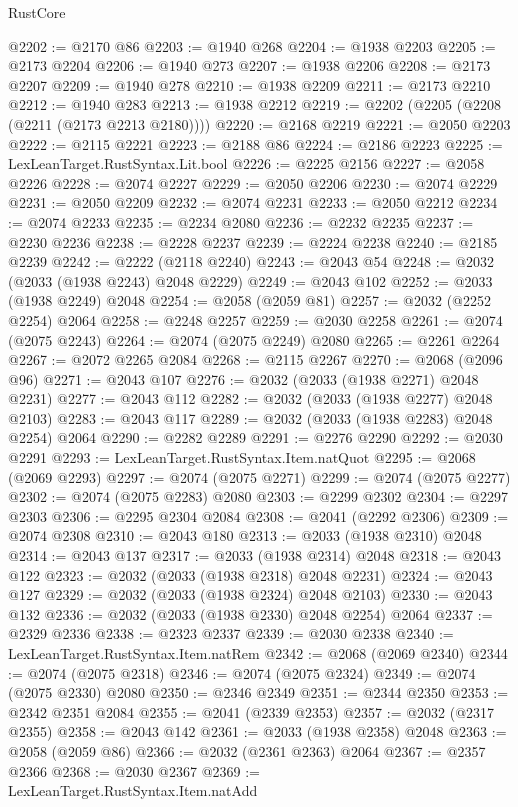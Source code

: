 \begin{lexlean}{RustCore}
\begin{coremodule}
@2202 := @2170 @86
@2203 := @1940 @268
@2204 := @1938 @2203
@2205 := @2173 @2204
@2206 := @1940 @273
@2207 := @1938 @2206
@2208 := @2173 @2207
@2209 := @1940 @278
@2210 := @1938 @2209
@2211 := @2173 @2210
@2212 := @1940 @283
@2213 := @1938 @2212
@2219 := @2202 (@2205 (@2208 (@2211 (@2173 @2213 @2180))))
@2220 := @2168 @2219
@2221 := @2050 @2203
@2222 := @2115 @2221
@2223 := @2188 @86
@2224 := @2186 @2223
@2225 := LexLeanTarget.RustSyntax.Lit.bool
@2226 := @2225 @2156
@2227 := @2058 @2226
@2228 := @2074 @2227
@2229 := @2050 @2206
@2230 := @2074 @2229
@2231 := @2050 @2209
@2232 := @2074 @2231
@2233 := @2050 @2212
@2234 := @2074 @2233
@2235 := @2234 @2080
@2236 := @2232 @2235
@2237 := @2230 @2236
@2238 := @2228 @2237
@2239 := @2224 @2238
@2240 := @2185 @2239
@2242 := @2222 (@2118 @2240)
@2243 := @2043 @54
@2248 := @2032 (@2033 (@1938 @2243) @2048 @2229)
@2249 := @2043 @102
@2252 := @2033 (@1938 @2249) @2048
@2254 := @2058 (@2059 @81)
@2257 := @2032 (@2252 @2254) @2064
@2258 := @2248 @2257
@2259 := @2030 @2258
@2261 := @2074 (@2075 @2243)
@2264 := @2074 (@2075 @2249) @2080
@2265 := @2261 @2264
@2267 := @2072 @2265 @2084
@2268 := @2115 @2267
@2270 := @2068 (@2096 @96)
@2271 := @2043 @107
@2276 := @2032 (@2033 (@1938 @2271) @2048 @2231)
@2277 := @2043 @112
@2282 := @2032 (@2033 (@1938 @2277) @2048 @2103)
@2283 := @2043 @117
@2289 := @2032 (@2033 (@1938 @2283) @2048 @2254) @2064
@2290 := @2282 @2289
@2291 := @2276 @2290
@2292 := @2030 @2291
@2293 := LexLeanTarget.RustSyntax.Item.natQuot
@2295 := @2068 (@2069 @2293)
@2297 := @2074 (@2075 @2271)
@2299 := @2074 (@2075 @2277)
@2302 := @2074 (@2075 @2283) @2080
@2303 := @2299 @2302
@2304 := @2297 @2303
@2306 := @2295 @2304 @2084
@2308 := @2041 (@2292 @2306)
@2309 := @2074 @2308
@2310 := @2043 @180
@2313 := @2033 (@1938 @2310) @2048
@2314 := @2043 @137
@2317 := @2033 (@1938 @2314) @2048
@2318 := @2043 @122
@2323 := @2032 (@2033 (@1938 @2318) @2048 @2231)
@2324 := @2043 @127
@2329 := @2032 (@2033 (@1938 @2324) @2048 @2103)
@2330 := @2043 @132
@2336 := @2032 (@2033 (@1938 @2330) @2048 @2254) @2064
@2337 := @2329 @2336
@2338 := @2323 @2337
@2339 := @2030 @2338
@2340 := LexLeanTarget.RustSyntax.Item.natRem
@2342 := @2068 (@2069 @2340)
@2344 := @2074 (@2075 @2318)
@2346 := @2074 (@2075 @2324)
@2349 := @2074 (@2075 @2330) @2080
@2350 := @2346 @2349
@2351 := @2344 @2350
@2353 := @2342 @2351 @2084
@2355 := @2041 (@2339 @2353)
@2357 := @2032 (@2317 @2355)
@2358 := @2043 @142
@2361 := @2033 (@1938 @2358) @2048
@2363 := @2058 (@2059 @86)
@2366 := @2032 (@2361 @2363) @2064
@2367 := @2357 @2366
@2368 := @2030 @2367
@2369 := LexLeanTarget.RustSyntax.Item.natAdd

\end{coremodule}
\end{lexlean}
